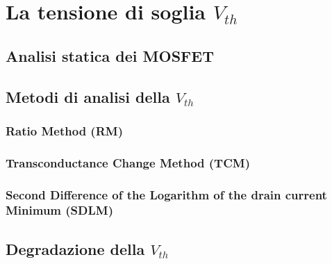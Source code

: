 \documentclass[12pt, letterpaper]{book}
\begin{document}
	\part{La tensione di soglia $V_{th}$}
	\chapter{Analisi statica dei MOSFET}
	\chapter{Metodi di analisi della $V_{th}$}
	\section{Ratio Method (RM)}
	\section{Transconductance Change Method (TCM)}
	\section{Second Difference of the Logarithm of the drain current Minimum (SDLM)}
	\chapter{Degradazione della $V_{th}$}
\end{document}
